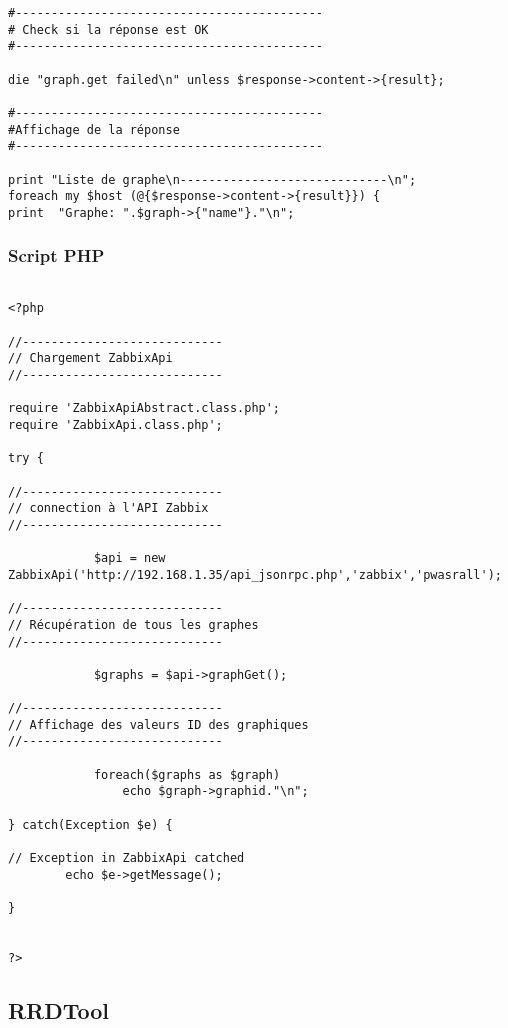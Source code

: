 \begin{verbatim}
#-------------------------------------------
# Check si la réponse est OK
#-------------------------------------------

die "graph.get failed\n" unless $response->content->{result};

#-------------------------------------------
#Affichage de la réponse
#-------------------------------------------

print "Liste de graphe\n-----------------------------\n";
foreach my $host (@{$response->content->{result}}) {
print  "Graphe: ".$graph->{"name"}."\n";

\end{verbatim}

\newpage

		\subsubsection{Script PHP}
		\vspace{0.3cm}

\begin{verbatim}

<?php

//----------------------------
// Chargement ZabbixApi
//----------------------------

require 'ZabbixApiAbstract.class.php';
require 'ZabbixApi.class.php';

try {

//----------------------------
// connection à l'API Zabbix 
//----------------------------

		    $api = new ZabbixApi('http://192.168.1.35/api_jsonrpc.php','zabbix','pwasrall');

//----------------------------
// Récupération de tous les graphes
//----------------------------

			$graphs = $api->graphGet();

//----------------------------
// Affichage des valeurs ID des graphiques
//----------------------------
			
			foreach($graphs as $graph)
				echo $graph->graphid."\n";

} catch(Exception $e) {

// Exception in ZabbixApi catched
	    echo $e->getMessage();

}


?>
\end{verbatim}

	\subsection{RRDTool}


